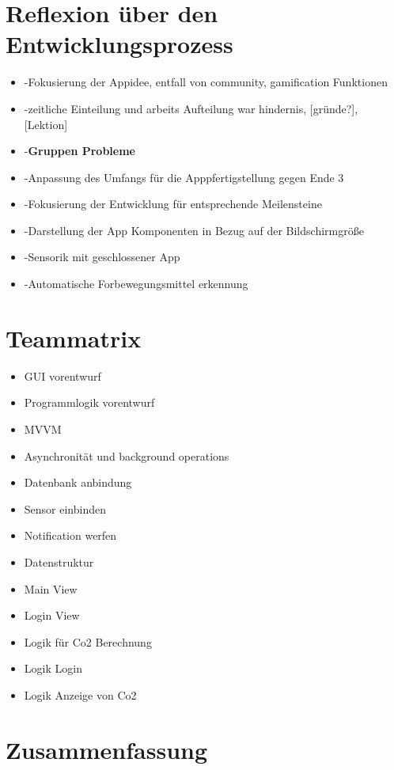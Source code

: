 \documentclass{article}
\begin{document}
   

\section{Reflexion über den Entwicklungsprozess}
 \begin{itemize}
    \item -Fokusierung der Appidee, entfall von community, gamification Funktionen
	\item -zeitliche Einteilung und arbeits Aufteilung war hindernis,         [gründe?], [Lektion]
	\item -\textbf{Gruppen Probleme}
	\item -Anpassung des Umfangs für die Apppfertigstellung gegen Ende 3
 	\item -Fokusierung der Entwicklung für entsprechende Meilensteine
	\item -Darstellung der App Komponenten in Bezug auf der Bildschirmgröße
	\item -Sensorik mit geschlossener App
	\item -Automatische Forbewegungsmittel erkennung
    
  \end{itemize}
  
  
\section{Teammatrix}

 \begin{itemize}
 \item GUI vorentwurf
 \item Programmlogik vorentwurf
 \item MVVM
 \item Asynchronität und background operations
 \item Datenbank anbindung
 \item Sensor einbinden
 \item Notification werfen
 \item Datenstruktur
 \item Main View
 \item Login View
 \item Logik für Co2 Berechnung
 \item Logik Login
 \item Logik Anzeige von Co2
 \end{itemize}
    


\section{Zusammenfassung}
\end{document}
